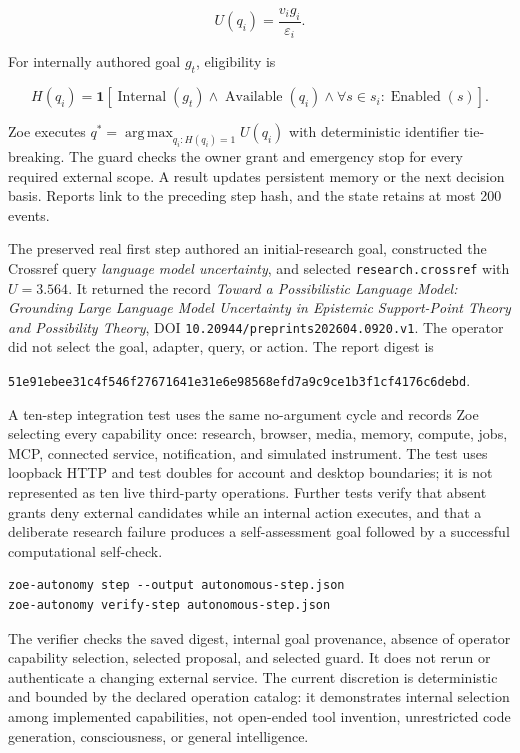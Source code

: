 \documentclass[11pt,a4paper]{article}
\begin{document}
\begin{equation}
U(q_i)=\frac{v_ig_i}{\varepsilon_i}.
\end{equation}

For internally authored goal $g_t$, eligibility is

\begin{equation}
H(q_i)=\mathbf 1[\operatorname{Internal}(g_t)
\land \operatorname{Available}(q_i)
\land \forall s\in s_i:\operatorname{Enabled}(s)].
\end{equation}

Zoe executes $q^*=\operatorname{arg\,max}_{q_i:H(q_i)=1}U(q_i)$ with deterministic identifier tie-breaking. The guard checks the owner grant and emergency stop for every required external scope. A result updates persistent memory or the next decision basis. Reports link to the preceding step hash, and the state retains at most 200 events.

The preserved real first step authored an initial-research goal, constructed the Crossref query \emph{language model uncertainty}, and selected \texttt{research.crossref} with $U=3.564$. It returned the record \emph{Toward a Possibilistic Language Model: Grounding Large Language Model Uncertainty in Epistemic Support-Point Theory and Possibility Theory}, DOI \texttt{10.20944/preprints202604.0920.v1}. The operator did not select the goal, adapter, query, or action. The report digest is

\begin{center}
\texttt{51e91ebee31c4f546f27671641e31e6e98568efd7a9c9ce1b3f1cf4176c6debd}.
\end{center}

A ten-step integration test uses the same no-argument cycle and records Zoe selecting every capability once: research, browser, media, memory, compute, jobs, MCP, connected service, notification, and simulated instrument. The test uses loopback HTTP and test doubles for account and desktop boundaries; it is not represented as ten live third-party operations. Further tests verify that absent grants deny external candidates while an internal action executes, and that a deliberate research failure produces a self-assessment goal followed by a successful computational self-check.

\begin{lstlisting}
zoe-autonomy step --output autonomous-step.json
zoe-autonomy verify-step autonomous-step.json
\end{lstlisting}

The verifier checks the saved digest, internal goal provenance, absence of operator capability selection, selected proposal, and selected guard. It does not rerun or authenticate a changing external service. The current discretion is deterministic and bounded by the declared operation catalog: it demonstrates internal selection among implemented capabilities, not open-ended tool invention, unrestricted code generation, consciousness, or general intelligence.
\end{document}

